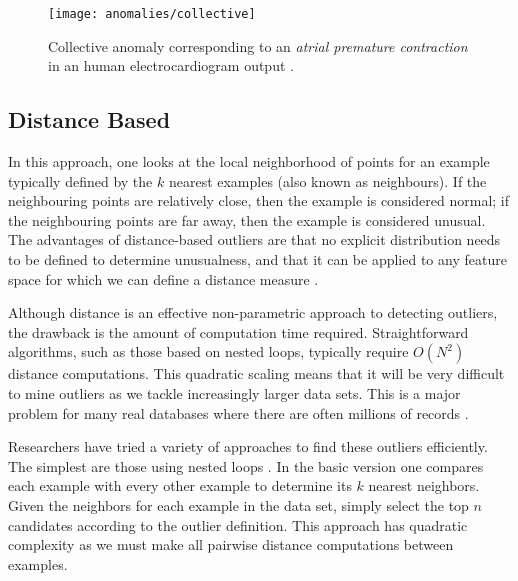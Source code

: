 \begin{description}
\begin{figure}
    \centering
    \texttt{[image: anomalies/collective]}
    \caption[Collective anomaly corresponding to an \emph{atrial premature
        contraction} in an human electrocardiogram output.]
        {Collective anomaly corresponding to an \emph{atrial premature
        contraction} in an human electrocardiogram output
        \cite{Goldberger:2000}.}
    \label{fig:collective-anomalies}
\end{figure}

\end{description}

\subsection{Distance Based}
\label{anomalyDetection:approaches:distance}
In this approach, one looks at the local neighborhood of points for an example
typically defined by the $k$ nearest examples (also known as neighbours). If the
neighbouring points are relatively close, then the example is considered normal;
if the neighbouring points are far away, then the example is considered unusual.
The advantages of distance-based outliers are that no explicit distribution
needs to be defined to determine unusualness, and that it can be applied to any
feature space for which we can define a distance measure \cite{Bay:2003}.

Although distance is an effective non-parametric approach to detecting outliers,
the drawback is the amount of computation time required. Straightforward
algorithms, such as those based on nested loops, typically require $O(N^2)$
distance computations. This quadratic scaling means that it will be very
difficult to mine outliers as we tackle increasingly larger data sets. This is a
major problem for many real databases where there are often millions of records
\cite{Bay:2003}.

Researchers have tried a variety of approaches to find these outliers
efficiently. The simplest are those using nested loops \cite{Bay:2003}. In the
basic version one compares each example with every other example to determine
its $k$ nearest neighbors. Given the neighbors for each example in the data set,
simply select the top $n$ candidates according to the outlier definition. This
approach has quadratic complexity as we must make all pairwise distance
computations between examples.

